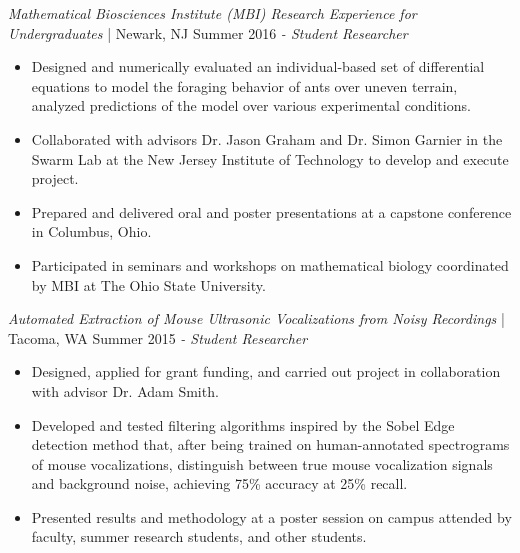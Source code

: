 \textit{Mathematical Biosciences Institute (MBI) Research Experience for Undergraduates} | Newark, NJ \hfill Summer 2016 \newline 
\textit{- Student Researcher} \\
  \vspace{-4.5mm}
 \begin{itemize}
 \item Designed and numerically evaluated an individual-based set of differential equations to model the foraging behavior of ants over uneven terrain, analyzed predictions of the model over various experimental conditions.
  \item Collaborated with advisors Dr. Jason Graham and Dr. Simon Garnier in the Swarm Lab at the New Jersey Institute of Technology to develop and execute project.
 \item Prepared and delivered oral and poster presentations at a capstone conference in Columbus, Ohio.
 \item Participated in seminars and workshops on mathematical biology coordinated by MBI at The Ohio State University.
 \end{itemize}
  \vspace{-3.5mm}

\textit{Automated Extraction of Mouse Ultrasonic Vocalizations from Noisy Recordings} | Tacoma, WA \hfill Summer 2015 \newline 
\textit{- Student Researcher} \\
  \vspace{-4.5mm}
 \begin{itemize}
 \item Designed, applied for grant funding, and carried out project in collaboration with advisor Dr. Adam Smith.
 \item Developed and tested filtering algorithms inspired by the Sobel Edge detection method that, after being trained on human-annotated spectrograms of mouse vocalizations, distinguish between true mouse vocalization signals and background noise, achieving 75\% accuracy at 25\% recall.
 \item Presented results and methodology at a poster session on campus attended by faculty, summer research students, and other students. 
 \end{itemize}
  \vspace{-3.5mm}
  
